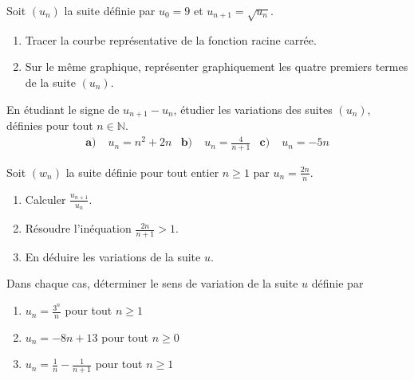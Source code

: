 \documentclass[11pt]{article}
\begin{document}
\begin{exo}
Soit $(u_n)$ la suite définie par $u_0 = 9$ et $u_{n+1} = \sqrt{u_n}$.
\begin{enumerate}
  \item Tracer la courbe représentative de la fonction racine carrée.
  \item Sur le même graphique, représenter graphiquement les quatre premiers termes de la suite $(u_n)$.
\end{enumerate}
\end{exo}

\begin{exo}
En étudiant le signe de $u_{n+1} - u_n$, étudier les variations des suites
$(u_n)$, définies pour tout $n \in \mathbb{N}$.
\begin{align*}
  \textbf{a)}\;& u_n = n^2 + 2n &
  \textbf{b)}\;& u_n = \frac{4}{n + 1} &
  \textbf{c)}\;& u_n = -5n
\end{align*}
\end{exo}

\begin{exo}
  Soit $(w_n)$ la suite définie pour tout entier $n \geq 1$ par $u_n = \frac{2n}{n}$.
  \begin{enumerate}
    \item Calculer $\frac{u_{n+1}}{u_n}$.
    \item Résoudre l'inéquation $\frac{2n}{n+1} > 1$.
    \item En déduire les variations de la suite $u$.
  \end{enumerate}
\end{exo}

\begin{exo}
Dans chaque cas, déterminer le sens de variation de la suite $u$ définie par
\begin{enumerate}
  \item $u_{n}=\frac{3^{n}}{n}$ pour tout $n \geq 1$
  \item $u_{n}=-8 n+13$ pour tout $n \geq 0$
  \item $u_{n}=\frac{1}{n}-\frac{1}{n+1}$ pour tout $n \geq 1$
\end{enumerate} 
\end{exo}
\end{document}
